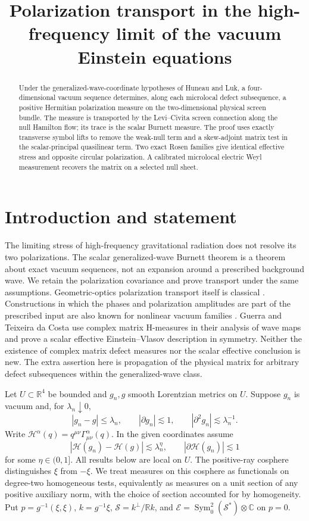 \documentclass[11pt]{article}
\title{Polarization transport in the high-frequency limit of the vacuum Einstein equations}
\author{}
\date{}
\begin{document}
\maketitle
\begin{abstract}
Under the generalized-wave-coordinate hypotheses of Huneau and Luk, a four-dimensional vacuum sequence determines, along each microlocal defect subsequence, a positive Hermitian polarization measure on the two-dimensional physical screen bundle. The measure is transported by the Levi--Civita screen connection along the null Hamilton flow; its trace is the scalar Burnett measure. The proof uses exactly transverse symbol lifts to remove the weak-null term and a skew-adjoint matrix test in the scalar-principal quasilinear term. Two exact Rosen families give identical effective stress and opposite circular polarization. A calibrated microlocal electric Weyl measurement recovers the matrix on a selected null sheet.
\end{abstract}

\section{Introduction and statement}
The limiting stress of high-frequency gravitational radiation does not resolve its two polarizations. The scalar generalized-wave Burnett theorem \cite{Burnett,HL} is a theorem about exact vacuum sequences, not an expansion around a prescribed background wave. We retain the polarization covariance and prove transport under the same assumptions. Geometric-optics polarization transport itself is classical \cite{Isaacson,Dolan,AJ}. Constructions in which the phases and polarization amplitudes are part of the prescribed input are also known for nonlinear vacuum families \cite{Touati,Multi}. Guerra and Teixeira da Costa \cite{GTC} use complex matrix H-measures in their analysis of wave maps and prove a scalar effective Einstein--Vlasov description in symmetry. Neither the existence of complex matrix defect measures nor the scalar effective conclusion is new. The extra assertion here is propagation of the physical matrix for arbitrary defect subsequences within the generalized-wave class.

Let \(U\subset\mathbb R^4\) be bounded and \(g_n,g\) smooth Lorentzian metrics on \(U\). Suppose \(g_n\) is vacuum and, for \(\lambda_n\downarrow0\),
\[
 |g_n-g|\le \lambda_n,\qquad |\partial g_n|\lesssim1,\qquad
 |\partial^2 g_n|\lesssim\lambda_n^{-1}.
\]
Write \(\mathcal H^\alpha(q)=q^{\mu\nu}\Gamma^\alpha_{\mu\nu}(q)\). In the given coordinates assume
\[
 |\mathcal H(g_n)-\mathcal H(g)|\lesssim \lambda_n^\eta,\qquad
 |\partial\mathcal H(g_n)|\lesssim1
\]
for some \(\eta\in(0,1]\). All results below are local on \(U\). The positive-ray cosphere distinguishes \(\xi\) from \(-\xi\). We treat measures on this cosphere as functionals on degree-two homogeneous tests, equivalently as measures on a unit section of any positive auxiliary norm, with the choice of section accounted for by homogeneity. Put \(p=g^{-1}(\xi,\xi)\), \(k=g^{-1}\xi\), \(\mathscr S=k^\perp/\mathbb Rk\), and \(\mathcal E=\operatorname{Sym}^2_0(\mathscr S^*)\otimes\mathbb C\) on \(p=0\).
\end{document}
